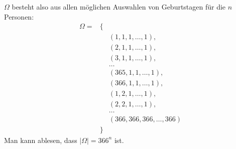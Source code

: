 $\Omega$ besteht also aus allen möglichen Auswahlen von Geburtstagen
für die $n$ Personen:
\begin{eqnarray*}
\Omega=&\{&\\
&&(1,1,1,\dots,1),\\
&&(2,1,1,\dots,1),\\
&&(3,1,1,\dots,1),\\
&&\dots\\
&&(365,1,1,\dots,1),\\
&&(366,1,1,\dots,1),\\
&&(1,2,1,\dots,1),\\
&&(2,2,1,\dots,1),\\
&&\dots\\
&&(366,366,366,\dots,366)\\
&\}&
\end{eqnarray*}
Man kann ablesen, dass $|\Omega|=366^n$ ist.

